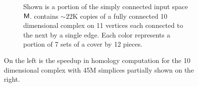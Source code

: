 \begin{figure}
\begin{subfigure}[t]{.45\linewidth}
\label{fig:blobs-speedup}
\end{subfigure}
\hspace{1cm}
\begin{subfigure}[t]{.45\linewidth}
\vspace{-1.27cm}
\vspace{1cm}
\caption{Shown is a portion of the simply connected input space $\textsf{M}$. {\blobs} contains ${\sim}22$K copies of a fully connected 10 dimensional complex on 11 vertices each connected to the next by a single edge.
Each color represents a portion of 7 sets of a cover by 12 pieces.}
\label{fig:blobs-vis}
\vspace*{\baselineskip}
\end{subfigure}
\caption{On the left is the speedup in homology computation for the 10 dimensional complex with 45M simplices partially shown on the right.}
\label{fig:front-picture}
\end{figure}